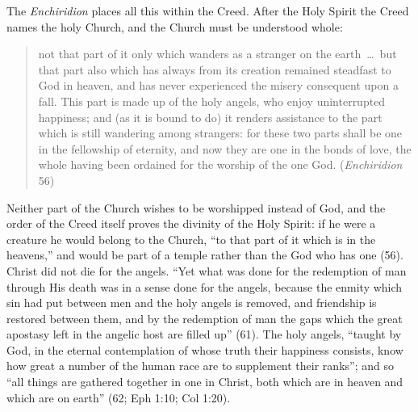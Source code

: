 The \emph{Enchiridion} places all this within the Creed. After the Holy
Spirit the Creed names the holy Church, and the Church must be understood
whole:
\begin{quote}
not that part of it only which wanders as a stranger on the earth~\dots\
but that part also which has always from its creation remained steadfast
to God in heaven, and has never experienced the misery consequent upon a
fall. This part is made up of the holy angels, who enjoy uninterrupted
happiness; and (as it is bound to do) it renders assistance to the part
which is still wandering among strangers: for these two parts shall be
one in the fellowship of eternity, and now they are one in the bonds of
love, the whole having been ordained for the worship of the one God.
(\emph{Enchiridion} 56)
\end{quote}
Neither part of the Church wishes to be worshipped instead of God, and
the order of the Creed itself proves the divinity of the Holy Spirit: if
he were a creature he would belong to the Church, ``to that part of it
which is in the heavens,'' and would be part of a temple rather than the
God who has one (56). Christ did not die for the angels. ``Yet what was done
for the redemption of man through His death was in a sense done for the
angels, because the enmity which sin had put between men and the holy
angels is removed, and friendship is restored between them, and by the
redemption of man the gaps which the great apostasy left in the angelic
host are filled up'' (61). The holy angels, ``taught by God, in the
eternal contemplation of whose truth their happiness consists, know how
great a number of the human race are to supplement their ranks''; and so
``all things are gathered together in one in Christ, both which are in
heaven and which are on earth'' (62; Eph 1:10; Col 1:20).

